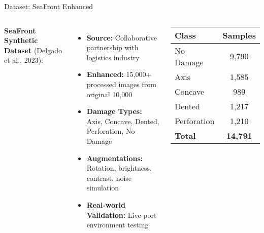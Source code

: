 \documentclass[aspectratio=169]{beamer}
\begin{document}
\begin{frame}{Dataset: SeaFront Enhanced}
\begin{columns}
\textbf{SeaFront Synthetic Dataset} (Delgado et al., 2023):
\begin{itemize}
\item \textbf{Source:} Collaborative partnership with logistics industry
\item \textbf{Enhanced:} 15,000+ processed images from original 10,000
\item \textbf{Damage Types:} Axis, Concave, Dented, Perforation, No Damage
\item \textbf{Augmentations:} Rotation, brightness, contrast, noise simulation
\item \textbf{Real-world Validation:} Live port environment testing
\end{itemize}

\begin{center}
\small
\begin{tabular}{|l|c|}
\hline
\textbf{Class} & \textbf{Samples} \\
\hline
No Damage & 9,790 \\
Axis & 1,585 \\
Concave & 989 \\
Dented & 1,217 \\
Perforation & 1,210 \\
\hline
\textbf{Total} & \textbf{14,791} \\
\hline
\end{tabular}
\end{center}
\end{columns}
\end{frame}
\end{document}
